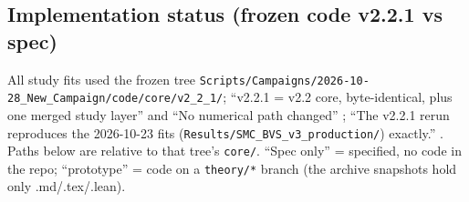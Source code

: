 \subsection{Implementation status (frozen code v2.2.1 vs spec)}\label{sec:method-impl}

All study fits used the frozen tree \texttt{Scripts/Campaigns/2026-10-28\_New\_Campaign/code/core/v2\_2\_1/}; ``v2.2.1 = v2.2 core,
byte-identical, plus one merged study layer'' and ``No numerical path changed''
; ``The v2.2.1 rerun reproduces the 2026-10-23
fits (\texttt{Results/SMC\_BVS\_v3\_production/}) exactly.'' . Paths below are relative to that tree's
\texttt{core/}. ``Spec only'' = specified, no code in the repo; ``prototype'' = code on a \texttt{theory/*} branch (the
archive snapshots hold only .md/.tex/.lean).

